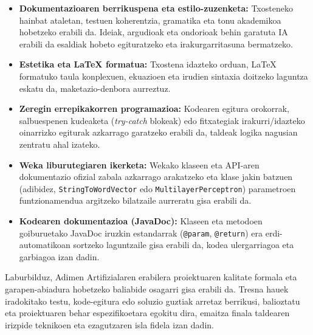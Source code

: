 \documentclass[12pt, a4paper]{article}
\begin{document}
\begin{itemize}
    \item \textbf{Dokumentazioaren berrikuspena eta estilo-zuzenketa:} Txosteneko hainbat ataletan, testuen koherentzia, gramatika eta tonu akademikoa hobetzeko erabili da. Ideiak, argudioak eta ondorioak behin garatuta IA erabili da esaldiak hobeto egituratzeko eta irakurgarritasuna bermatzeko.
    \item \textbf{Estetika eta LaTeX formatua:} Txostena idazteko orduan, LaTeX formatuko taula konplexuen, ekuazioen eta irudien sintaxia doitzeko laguntza eskatu da, maketazio-denbora aurreztuz.
    \item \textbf{Zeregin errepikakorren programazioa:} Kodearen egitura orokorrak, salbuespenen kudeaketa (\textit{try-catch} blokeak) edo fitxategiak irakurri/idazteko oinarrizko egiturak azkarrago garatzeko erabili da, taldeak logika nagusian zentratu ahal izateko.
    \item \textbf{Weka liburutegiaren ikerketa:} Wekako klaseen eta API-aren dokumentazio ofizial zabala azkarrago arakatzeko eta klase jakin batzuen (adibidez, \texttt{StringToWordVector} edo \texttt{MultilayerPerceptron}) parametroen funtzionamendua argitzeko bilatzaile aurreratu gisa erabili da.
    \item \textbf{Kodearen dokumentazioa (JavaDoc):} Klaseen eta metodoen goiburuetako JavaDoc iruzkin estandarrak (\texttt{@param}, \texttt{@return}) era erdi-automatikoan sortzeko laguntzaile gisa erabili da, kodea ulergarriagoa eta garbiagoa izan dadin.
\end{itemize}

Laburbilduz, Adimen Artifizialaren erabilera proiektuaren kalitate formala eta garapen-abiadura hobetzeko baliabide osagarri gisa erabili da. Tresna hauek iradokitako testu, kode-egitura edo soluzio guztiak arretaz berrikusi, balioztatu eta proiektuaren behar espezifikoetara egokitu dira, emaitza finala taldearen irizpide teknikoen eta ezagutzaren isla fidela izan dadin.
\end{document}
